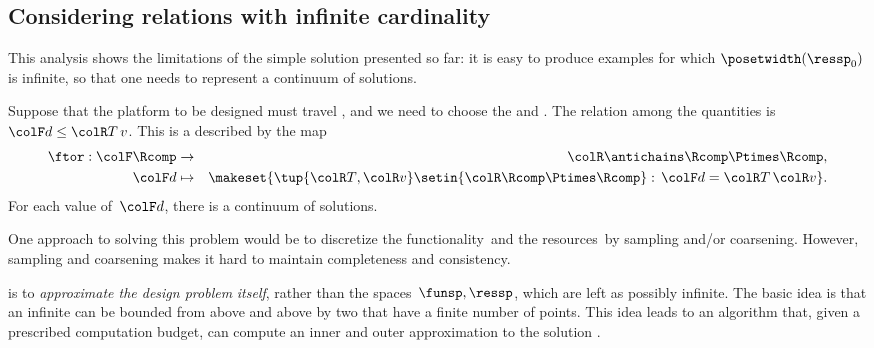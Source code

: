 \subsection{Considering relations with infinite cardinality}

This analysis shows the limitations of the simple solution presented so far: it is easy to produce examples for which $\posetwidth(\ressp_{0})$ is infinite, so that one needs to represent a continuum of solutions.

\begin{example}
    Suppose that the platform to be designed must travel , and we need to choose the  and .
    The relation among the quantities is~${\colF d}\leq{\colR T\,v}$.
    This is a  described by the map
    \begin{eqnarray*}
        \ftor:{\colF\Rcomp} & \to & {\colR\antichains\Rcomp\Ptimes\Rcomp,}\\
        {\colF d} & \mapsto & \makeset{\tup{{\colR T},{\colR v}}\setin{\colR\Rcomp\Ptimes\Rcomp}:\,{\colF d}={\colR T}\,{\colR v}}.
    \end{eqnarray*}
    For each value of~${\colF d}$, there is a continuum of solutions.
\end{example}
One approach to solving this problem would be to discretize the functionality~\funsp and the resources~\ressp by sampling and/or coarsening.
However, sampling and coarsening makes it hard to maintain completeness and consistency.

%
%
is to \emph{approximate the design problem} \emph{itself}, rather than the spaces~$\funsp,\ressp$, which are left as possibly infinite.
The basic idea is that an infinite  can be bounded from above and above by two  that have a finite number of points.
This idea leads to an algorithm that, given a prescribed computation budget, can compute an inner and outer approximation to the solution .
